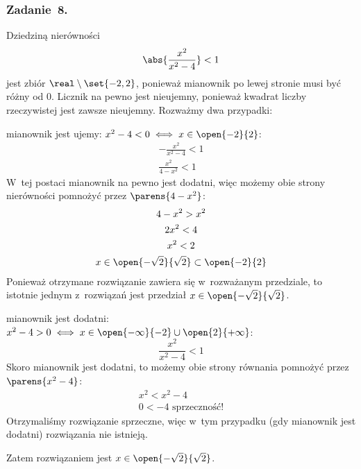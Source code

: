 \subsubsection*{Zadanie~8.}
Dziedziną nierówności
\begin{equation*}
    \abs{\frac{x^2}{x^2 - 4}} < 1
\end{equation*}
jest zbiór \(\real \setminus \set{-2, 2}\), ponieważ mianownik po lewej stronie musi być różny od \(0\). Licznik na pewno jest nieujemny, ponieważ kwadrat liczby rzeczywistej jest zawsze nieujemny. Rozważmy dwa przypadki:
\begin{proofcases}
    \item mianownik jest ujemy: \(x^2 - 4 < 0 \iff x \in \open{-2}{2}\):
        \begin{gather*}
            -\frac{x^2}{x^2 - 4} < 1\\
            \frac{x^2}{4 - x^2} < 1
        \end{gather*}
        W~tej postaci mianownik na pewno jest dodatni, więc możemy obie strony nierówności pomnożyć przez \(\parens{4 - x^2}\):
        \begin{gather*}
            4 - x^2 > x^2\\
            2x^2 < 4\\
            x^2 < 2\\
            x \in \open{-\sqrt{2}}{\sqrt{2}} \subset \open{-2}{2}
        \end{gather*}
        Ponieważ otrzymane rozwiązanie zawiera się w~rozważanym przedziale, to istotnie jednym z~rozwiązań jest przedział \(x \in \open{-\sqrt{2}}{\sqrt{2}}\).
    \item mianownik jest dodatni: \(x^2 - 4 > 0 \iff x \in \open{-\infty}{-2} \cup \open{2}{+\infty}\):
        \begin{equation*}
            \frac{x^2}{x^2 - 4} < 1
        \end{equation*}
        Skoro mianownik jest dodatni, to możemy obie strony równania pomnożyć przez \(\parens{x^2 - 4}\):
        \begin{gather*}
            x^2 < x^2 - 4\\
            0 < -4 \text{ sprzeczność!}
        \end{gather*}
        Otrzymaliśmy rozwiązanie sprzeczne, więc w~tym przypadku (gdy mianownik jest dodatni) rozwiązania nie istnieją.
\end{proofcases}
Zatem rozwiązaniem jest \(x \in \open{-\sqrt{2}}{\sqrt{2}}\).
